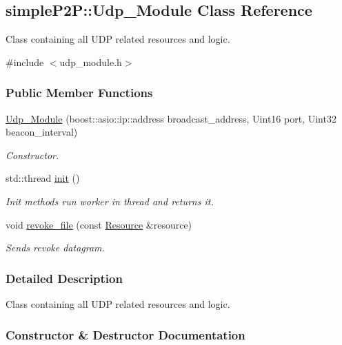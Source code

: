 \hypertarget{classsimpleP2P_1_1Udp__Module}{}\subsection{simple\+P2P\+:\+:Udp\+\_\+\+Module Class Reference}
\label{classsimpleP2P_1_1Udp__Module}


Class containing all U\+DP related resources and logic.  




{\ttfamily \#include $<$udp\+\_\+module.\+h$>$}

\subsubsection*{Public Member Functions}
\begin{DoxyCompactItemize}
\item 
\hyperlink{classsimpleP2P_1_1Udp__Module_ae82263553672721e6a6ec034617e08ba}{Udp\+\_\+\+Module} (boost\+::asio\+::ip\+::address broadcast\+\_\+address, Uint16 port, Uint32 beacon\+\_\+interval)
\begin{DoxyCompactList}\small\item\em Constructor. \end{DoxyCompactList}\item 
std\+::thread \hyperlink{classsimpleP2P_1_1Udp__Module_a6e1598a38a557ebdf6eb4849b3cde9db}{init} ()
\begin{DoxyCompactList}\small\item\em Init methods run worker in thread and returns it. \end{DoxyCompactList}\item 
void \hyperlink{classsimpleP2P_1_1Udp__Module_ad3904b2be4e113a8f7be11b23cfde4d2}{revoke\+\_\+file} (const \hyperlink{classsimpleP2P_1_1Resource}{Resource} \&resource)
\begin{DoxyCompactList}\small\item\em Sends revoke datagram. \end{DoxyCompactList}\end{DoxyCompactItemize}


\subsubsection{Detailed Description}
Class containing all U\+DP related resources and logic. 

\subsubsection{Constructor \& Destructor Documentation}
\mbox{\label{classsimpleP2P_1_1Udp__Module_ae82263553672721e6a6ec034617e08ba}} 

